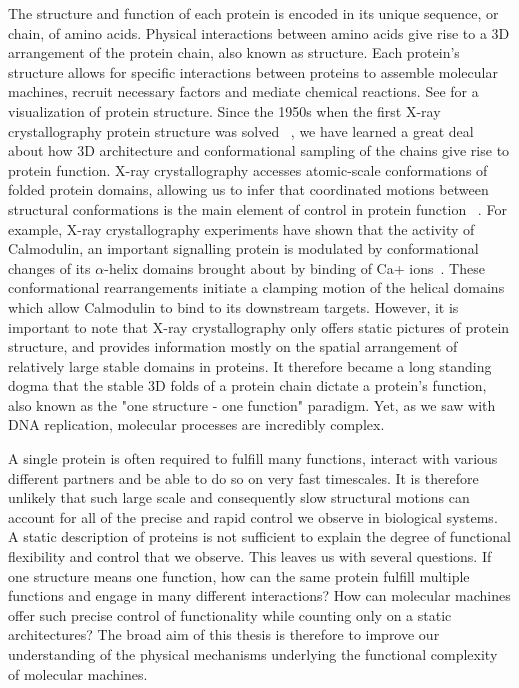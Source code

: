 The structure and function of each protein is encoded in its unique sequence, or chain, of amino acids. Physical interactions between amino acids give rise to a 3D arrangement of the protein chain, also known as structure. Each protein’s structure allows for specific interactions between  proteins  to  assemble molecular machines, recruit  necessary factors and mediate chemical reactions. See  for a visualization of protein structure. Since the 1950s when the first X-ray crystallography protein structure was solved ~\cite{kendrew1958three}, we have learned a great deal about how 3D architecture and conformational sampling of the chains give rise to protein function. X-ray crystallography accesses atomic-scale conformations of folded protein  domains, allowing us to infer that  coordinated  motions between structural conformations is the main element of control in protein function ~\cite{hegyi1999relationship}. For example, X-ray crystallography experiments have shown that the activity of Calmodulin, an important signalling protein is modulated by conformational changes of its $\alpha$-helix domains brought about by binding of Ca+ ions~\cite{meador1992target}. These conformational rearrangements initiate a clamping motion of the helical domains which allow Calmodulin to bind to its downstream targets. However, it is important to note that X-ray crystallography only offers static pictures of protein structure, and provides information mostly on the spatial arrangement of relatively large stable domains in proteins. It therefore became a long standing dogma that the stable 3D folds of a protein chain dictate a protein's function, also known as the "one structure - one function" paradigm. Yet, as we saw with DNA replication, molecular processes are incredibly complex. 

A single protein is often required to fulfill many functions, interact with various different partners and be able to do so on very fast timescales. It is therefore unlikely that such large scale and consequently slow structural motions can account for all of the precise and rapid control we observe in biological systems. A static description of proteins is not sufficient to explain the degree of functional flexibility and control that we observe. This leaves us with several questions. If one structure means one function, how can the same protein fulfill multiple functions and engage in many different interactions? How can molecular machines offer such precise control of functionality while counting only on a static architectures? The broad aim of this thesis is therefore to improve our understanding of the physical mechanisms underlying the functional complexity of molecular machines.

